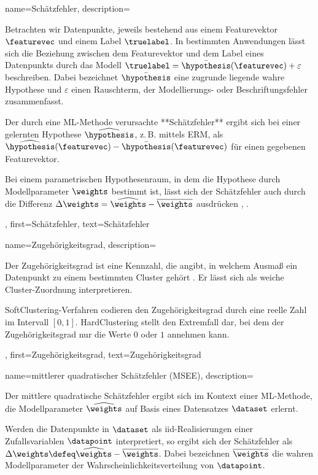 {{{
{
	name={Schätzfehler},
	description={
		Betrachten wir \gls{Datenpunkte}, jeweils bestehend aus einem \gls{Featurevektor} $\featurevec$ und einem \gls{Label} $\truelabel$. 
		In bestimmten Anwendungen lässt sich die Beziehung zwischen dem \gls{Featurevektor} und dem \gls{Label} 
		eines \gls{Datenpunkts} durch das Modell $\truelabel = \bar{\hypothesis}(\featurevec) + \varepsilon$ beschreiben. 
		Dabei bezeichnet $\bar{\hypothesis}$ eine zugrunde liegende wahre \gls{Hypothese} und $\varepsilon$ 
		einen Rauschterm, der Modellierungs- oder Beschriftungsfehler zusammenfasst. 
		
		Der durch eine \gls{ML}-Methode verursachte **Schätzfehler** ergibt sich bei einer gelernten \gls{Hypothese} 
		$\widehat{\hypothesis}$, z.\,B. mittels \gls{ERM}, als 
		$\widehat{\hypothesis}(\featurevec) - \bar{\hypothesis}(\featurevec)$ für einen gegebenen \gls{Featurevektor}. 
		
		Bei einem parametrischen \gls{Hypothesenraum}, in dem die \gls{Hypothese} durch \gls{Modellparameter} $\weights$ 
		bestimmt ist, lässt sich der Schätzfehler auch durch die Differenz $\Delta \weights = \widehat{\weights} - \overline{\weights}$ 
		ausdrücken \cite{kay}, \cite{hastie01statisticallearning}.
	},
	first={Schätzfehler},
	text={Schätzfehler}
}

{
	name={Zugehörigkeitsgrad},
	description={
		Der Zugehörigkeitsgrad ist eine Kennzahl, die angibt, in welchem Ausmaß ein \gls{Datenpunkt} 
		zu einem bestimmten \gls{Cluster} gehört \cite[Kap.~8]{MLBasics}. Er lässt sich als weiche \gls{Cluster}-Zuordnung interpretieren. 
		
		\Gls{SoftClustering}-Verfahren codieren den Zugehörigkeitsgrad durch eine reelle Zahl im Intervall $[0,1]$. 
		\Gls{HardClustering} stellt den Extremfall dar, bei dem der Zugehörigkeitsgrad nur die Werte $0$ oder $1$ annehmen kann.
	},
	first={Zugehörigkeitsgrad},
	text={Zugehörigkeitsgrad}
}

{
	name={mittlerer quadratischer Schätzfehler (MSEE)},
	description={
		Der mittlere quadratische Schätzfehler ergibt sich im Kontext einer \gls{ML}-Methode, 
		die \gls{Modellparameter} $\widehat{\weights}$ auf Basis eines \gls{Datensatzes} $\dataset$ erlernt. 
		
		Werden die \gls{Datenpunkte} in $\dataset$ als \gls{iid}-\gls{Realisierungen} einer \gls{Zufallsvariablen} $\datapoint$ interpretiert, 
		so ergibt sich der \gls{Schätzfehler} als $\Delta \weights \defeq \widehat{\weights} - \overline{\weights}$. 
		Dabei bezeichnen $\overline{\weights}$ die wahren \gls{Modellparameter} der \gls{Wahrscheinlichkeitsverteilung} von $\datapoint$. 
		
}}}}}
